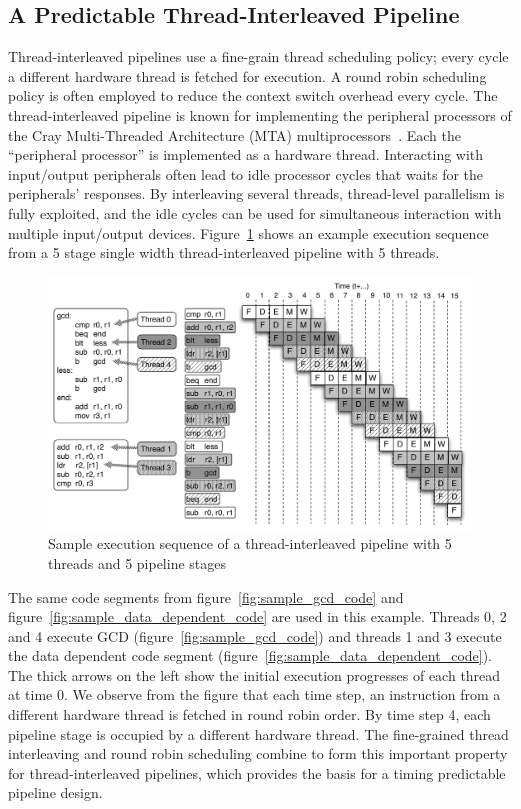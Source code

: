 \subsection{A Predictable Thread-Interleaved Pipeline}
\label{section:pret_thread_pipeline}
Thread-interleaved pipelines use a fine-grain thread scheduling policy; every cycle a different hardware thread is fetched for execution.
A round robin scheduling policy is often employed to reduce the context switch overhead every cycle.     
The thread-interleaved pipeline is known for implementing the peripheral processors of the Cray Multi-Threaded Architecture (MTA) multiprocessors~.
Each the ``peripheral processor'' is implemented as a hardware thread.     
Interacting with input/output peripherals often lead to idle processor cycles that waits for the peripherals' responses.
By interleaving several threads, thread-level parallelism is fully exploited, and the idle cycles can be used for simultaneous interaction with multiple input/output devices.       
Figure~\ref{fig:execution_thread_interleaved_pipeline} shows an example execution sequence from a 5 stage single width thread-interleaved pipeline with 5 threads.
\begin{figure}[h]
    \begin{center}
    \includegraphics[scale=.55]{figs/thread-interleaved-execution}
  \end{center}
  \vspace{-10pt}
  \caption{Sample execution sequence of a thread-interleaved pipeline with 5 threads and 5 pipeline stages}
  \label{fig:execution_thread_interleaved_pipeline}
\end{figure}

The same code segments from figure~\ref{fig:sample_gcd_code} and figure~\ref{fig:sample_data_dependent_code} are used in this example. 
Threads 0, 2 and 4 execute GCD (figure~\ref{fig:sample_gcd_code}) and threads 1 and 3 execute the data dependent code segment (figure~\ref{fig:sample_data_dependent_code}).
The thick arrows on the left show the initial execution progresses of each thread at time 0.
We observe from the figure that each time step, an instruction from a different hardware thread is fetched in round robin order.
By time step 4, each pipeline stage is occupied by a different hardware thread.
The fine-grained thread interleaving and round robin scheduling combine to form this important property for thread-interleaved pipelines, which provides the basis for a timing predictable pipeline design.

